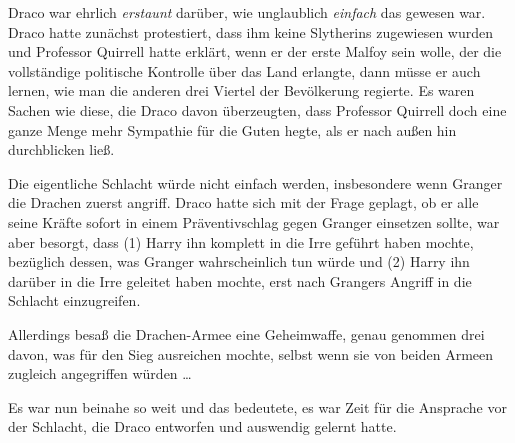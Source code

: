 Draco war ehrlich \emph{erstaunt} darüber, wie unglaublich \emph{einfach} das gewesen war. Draco hatte zunächst protestiert, dass ihm keine Slytherins zugewiesen wurden und Professor Quirrell hatte erklärt, wenn er der erste Malfoy sein wolle, der die vollständige politische Kontrolle über das Land erlangte, dann müsse er auch lernen, wie man die anderen drei Viertel der Bevölkerung regierte. Es waren Sachen wie diese, die Draco davon überzeugten, dass Professor Quirrell doch eine ganze Menge mehr Sympathie für die Guten hegte, als er nach außen hin durchblicken ließ.

Die eigentliche Schlacht würde nicht einfach werden, insbesondere wenn Granger die Drachen zuerst angriff. Draco hatte sich mit der Frage geplagt, ob er alle seine Kräfte sofort in einem Präventivschlag gegen Granger einsetzen sollte, war aber besorgt, dass (1) Harry ihn komplett in die Irre geführt haben mochte, bezüglich dessen, was Granger wahrscheinlich tun würde und (2) Harry ihn darüber in die Irre geleitet haben mochte, erst nach Grangers Angriff in die Schlacht einzugreifen.

Allerdings besaß die Drachen-Armee eine Geheimwaffe, genau genommen drei davon, was für den Sieg ausreichen mochte, selbst wenn sie von beiden Armeen zugleich angegriffen würden …

Es war nun beinahe so weit und das bedeutete, es war Zeit für die Ansprache vor der Schlacht, die Draco entworfen und auswendig gelernt hatte.

